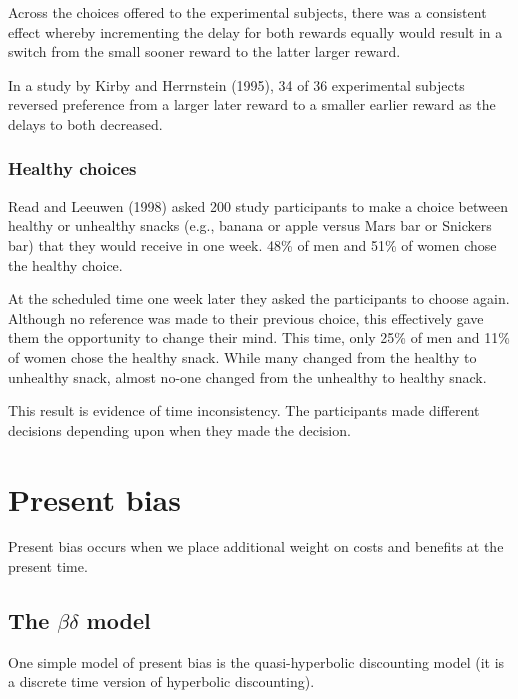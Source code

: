 \documentclass[
  letterpaper,
  DIV=11,
  numbers=noendperiod]{scrreprt}
\begin{document}
Across the choices offered to the experimental subjects, there was a
consistent effect whereby incrementing the delay for both rewards
equally would result in a switch from the small sooner reward to the
latter larger reward.

In a study by Kirby and Herrnstein (1995), 34 of 36 experimental
subjects reversed preference from a larger later reward to a smaller
earlier reward as the delays to both decreased.

\hypertarget{healthy-choices}{%
\subsection{Healthy choices}\label{healthy-choices}}

Read and Leeuwen (1998) asked 200 study participants to make a choice
between healthy or unhealthy snacks (e.g., banana or apple versus Mars
bar or Snickers bar) that they would receive in one week. 48\% of men
and 51\% of women chose the healthy choice.

At the scheduled time one week later they asked the participants to
choose again. Although no reference was made to their previous choice,
this effectively gave them the opportunity to change their mind. This
time, only 25\% of men and 11\% of women chose the healthy snack. While
many changed from the healthy to unhealthy snack, almost no-one changed
from the unhealthy to healthy snack.

This result is evidence of time inconsistency. The participants made
different decisions depending upon when they made the decision.

\hypertarget{present-bias}{%
\chapter{Present bias}\label{present-bias}}

Present bias occurs when we place additional weight on costs and
benefits at the present time.

\hypertarget{the-betadelta-model}{%
\section{\texorpdfstring{The \(\beta\delta\)
model}{The \textbackslash beta\textbackslash delta model}}\label{the-betadelta-model}}

One simple model of present bias is the quasi-hyperbolic discounting
model (it is a discrete time version of hyperbolic discounting).
\end{document}
